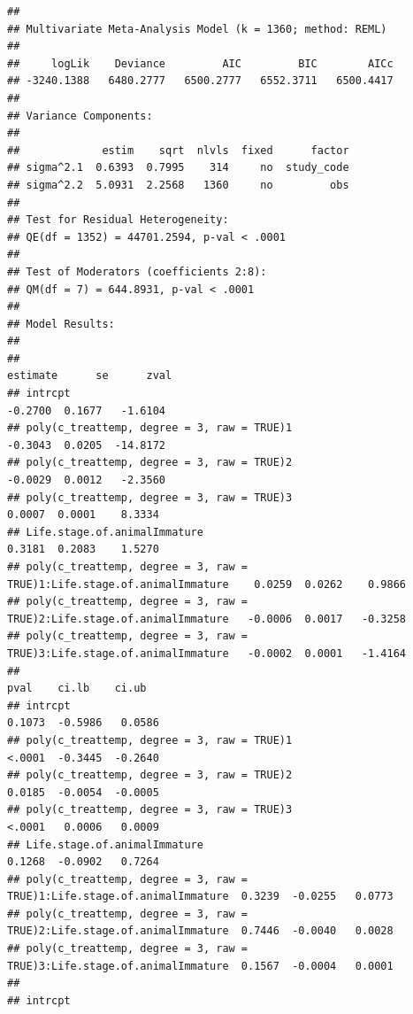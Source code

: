 \documentclass[
]{article}
\begin{document}
\begin{verbatim}
## 
## Multivariate Meta-Analysis Model (k = 1360; method: REML)
## 
##     logLik    Deviance         AIC         BIC        AICc   
## -3240.1388   6480.2777   6500.2777   6552.3711   6500.4417   
## 
## Variance Components:
## 
##             estim    sqrt  nlvls  fixed      factor 
## sigma^2.1  0.6393  0.7995    314     no  study_code 
## sigma^2.2  5.0931  2.2568   1360     no         obs 
## 
## Test for Residual Heterogeneity:
## QE(df = 1352) = 44701.2594, p-val < .0001
## 
## Test of Moderators (coefficients 2:8):
## QM(df = 7) = 644.8931, p-val < .0001
## 
## Model Results:
## 
##                                                                          estimate      se      zval 
## intrcpt                                                                   -0.2700  0.1677   -1.6104 
## poly(c_treattemp, degree = 3, raw = TRUE)1                                -0.3043  0.0205  -14.8172 
## poly(c_treattemp, degree = 3, raw = TRUE)2                                -0.0029  0.0012   -2.3560 
## poly(c_treattemp, degree = 3, raw = TRUE)3                                 0.0007  0.0001    8.3334 
## Life.stage.of.animalImmature                                               0.3181  0.2083    1.5270 
## poly(c_treattemp, degree = 3, raw = TRUE)1:Life.stage.of.animalImmature    0.0259  0.0262    0.9866 
## poly(c_treattemp, degree = 3, raw = TRUE)2:Life.stage.of.animalImmature   -0.0006  0.0017   -0.3258 
## poly(c_treattemp, degree = 3, raw = TRUE)3:Life.stage.of.animalImmature   -0.0002  0.0001   -1.4164 
##                                                                            pval    ci.lb    ci.ub 
## intrcpt                                                                  0.1073  -0.5986   0.0586 
## poly(c_treattemp, degree = 3, raw = TRUE)1                               <.0001  -0.3445  -0.2640 
## poly(c_treattemp, degree = 3, raw = TRUE)2                               0.0185  -0.0054  -0.0005 
## poly(c_treattemp, degree = 3, raw = TRUE)3                               <.0001   0.0006   0.0009 
## Life.stage.of.animalImmature                                             0.1268  -0.0902   0.7264 
## poly(c_treattemp, degree = 3, raw = TRUE)1:Life.stage.of.animalImmature  0.3239  -0.0255   0.0773 
## poly(c_treattemp, degree = 3, raw = TRUE)2:Life.stage.of.animalImmature  0.7446  -0.0040   0.0028 
## poly(c_treattemp, degree = 3, raw = TRUE)3:Life.stage.of.animalImmature  0.1567  -0.0004   0.0001 
##                                                                              
## intrcpt                                                                      

\end{verbatim}
\end{document}
